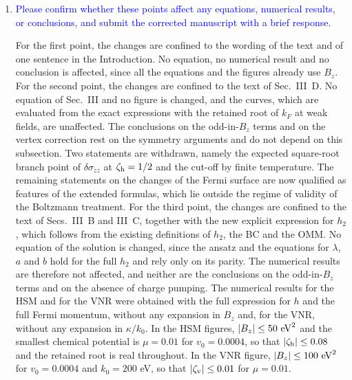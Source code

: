 \documentclass[aps,prb,onecolumn,nofootinbib,citeautoscript,10pt]{revtex4-2}
\DeclareRobustCommand{\bs}[1]{\bm{#1}}
\begin{document}
\begin{enumerate}
\\In Sec.~III~C, the first sentences now read: ``As for the single node, $h_{\chi,2}$ is odd under $\gamma\to\pi-\gamma$ for the full expression. The $\chi$-dependence enters only through the product $\chi\,B_z$ in quantities that are even under $\bs k\to-\bs k$, and it does not affect this parity. The node $\chi=+1$ coincides with the single node, and the relations $\bs\Omega_{\chi,2}=-\bs\Omega_{-\chi,2}$ and $\bs m_{\chi,2}=-\bs m_{-\chi,2}$ then imply that $h_{\chi,2}(\mu,\gamma)$ equals the single-node expression with $B_z$ replaced by $\chi\,B_z$. Its harmonic content is therefore that of the single node, with $B_z^n$ replaced by $\chi^n\,B_z^n$. Its integral against any weight that is even under $\gamma\to\pi-\gamma$ vanishes to all orders in $B_z$.'' Finally, the remark that $h_{\chi,2}$ is odd at every order in $B_z$ retained here, in the comparison with the BC-monopole nodes, now reads ``at every order in $B_z$''.

\item \textcolor{blue}{Please confirm whether these points affect any equations, numerical results, or conclusions, and submit the corrected manuscript with a brief response.}

For the first point, the changes are confined to the wording of the text and of one sentence in the Introduction. No equation, no numerical result and no conclusion is affected, since all the equations and the figures already use $B_z$. For the second point, the changes are confined to the text of Sec.~III~D. No equation of Sec.~III and no figure is changed, and the curves, which are evaluated from the exact expressions with the retained root of $k_F$ at weak fields, are unaffected. The conclusions on the odd-in-$B_z$ terms and on the vertex correction rest on the symmetry arguments and do not depend on this subsection. Two statements are withdrawn, namely the expected square-root branch point of $\delta\sigma_{zz}$ at $\zeta_{\rm h}=1/2$ and the cut-off by finite temperature. The remaining statements on the changes of the Fermi surface are now qualified as features of the extended formulas, which lie outside the regime of validity of the Boltzmann treatment. For the third point, the changes are confined to the text of Secs.~III~B and III~C, together with the new explicit expression for $h_2$, which follows from the existing definitions of $h_2$, the BC and the OMM. No equation of the solution is changed, since the ansatz and the equations for $\lambda$, $a$ and $b$ hold for the full $h_2$ and rely only on its parity. The numerical results are therefore not affected, and neither are the conclusions on the odd-in-$B_z$ terms and on the absence of charge pumping. The numerical results for the HSM and for the VNR were obtained with the full expression for $h$ and the full Fermi momentum, without any expansion in $B_z$ and, for the VNR, without any expansion in $\kappa/k_0$. In the HSM figures, $|B_z|\le50\ {\rm eV}^2$ and the smallest chemical potential is $\mu=0.01$ for $v_0=0.0004$, so that $|\zeta_{\rm h}|\le0.08$ and the retained root is real throughout. In the VNR figure, $|B_z|\le100\ {\rm eV}^2$ for $v_0=0.0004$ and $k_0=200$ eV, so that $|\zeta_{\rm v}|\le0.01$ for $\mu=0.01$.


\end{enumerate}
\end{document}

